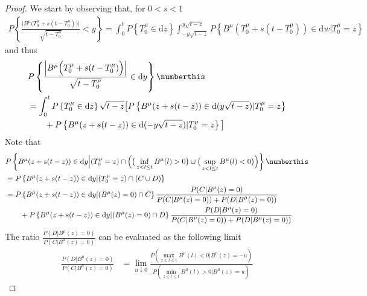 \begin{proof}
	We start by observing that, for $  0< s<1 $
	\begin{align}
		P\left\{   
	\frac { 
		\Big | B^\mu\Big ( T_0^\mu + s ( t - T_0^\mu) \Big )  \Big |    
	}
	{
		\sqrt{t - T^\mu_0}
	} <  y 
	\right\} 
	= 
	\int_0^t P\left\{T_0^\mu \in \mathrm d z \right\} \int_{ -y \sqrt{t-z}}^{ y \sqrt{t-z}}
	P \left\{ 
	 B^\mu  ( T_0^\mu + s ( t - T_0^\mu) )  \in \mathrm d w \Big | T_0^\mu = z
	\right\}
	\end{align}
	and thus 
	\begin{align*}
	&
	P\left\{   
	\frac { 
		\Big | B^\mu\Big ( T_0^\mu + s ( t - T_0^\mu) \Big )  \Big |    
	}
	{
		\sqrt{t - T^\mu_0}
	} \in \mathrm d y 
	\right\} 
	\numberthis 
	\label{eq:mdr-repr-full}
	\\
	 &=
	 \int_0^t P\left\{T_0^\mu \in \mathrm d z \right\} \sqrt{t -z}
	 \big[
	 P \left\{ 
	 B^\mu ( z + s (t-z)) \in \mathrm d (  y \sqrt{t-z}) | T_0^\mu = z
 	 \right\} 
 	 \\
 	 & \qquad 
 	 +
 	 P \left\{ 
 	 B^\mu ( z + s (t-z)) \in \mathrm d ( - y \sqrt{t-z}) | T_0^\mu = z
 	 \right\} 
	 \big]
	\end{align*}
	Note that 
	\begin{align*}
	&
	P\left\{ 
	B^\mu ( z + s (t-z)) \in \mathrm d y \Big | (T_0^\mu = z) \cap 
	\Big ( 
	\big( 
	\inf_{z < l \leq t} B^\mu ( l ) > 0 
	 \big)
	 \cup 
	 \big( 
	 \sup_{z < l \leq t} B^\mu ( l ) < 0 
	 \big)
	 \Big)
	\right\}
	\numberthis 
	\\
	&=
	P\left\{ 
	B^\mu ( z + s (t-z)) \in \mathrm d y | (T_0^\mu = z) \cap 
	(C
	\cup 
	D)
	\right\}
	\\
	&=
	P\left\{ 
	B^\mu ( z + s (t-z)) \in \mathrm d y | (B^\mu(z) = 0) \cap 
	C
	\right\} 
	\frac{\displaystyle
		P(C | B^\mu(z) = 0 )}
	{
		\displaystyle
			P(C | B^\mu(z) = 0 )) + 
		P(D | B^\mu(z) = 0 ))}
	\\
	& 
	\qquad + 
	P\left\{ 
	B^\mu ( z + s (t-z)) \in \mathrm d y | (B^\mu(z) = 0) \cap 
	D
	\right\} 
	\frac{\displaystyle
		P(D | B^\mu(z) = 0 )}
	{
		\displaystyle
		P(C | B^\mu(z) = 0 )) + 
		P(D | B^\mu(z) = 0 ))}
	\end{align*}
	The ratio 
	$  \frac{P(D | B^\mu(z) = 0)}{P( C |B^\mu(z) = 0 )} $
	can be evaluated as the following limit
	\begin{align*}
	\frac{P(D | B^\mu(z) = 0)}{P( C |B^\mu(z) = 0 )} 
	&= 
	\lim_{u \downarrow 0 } 
	\frac{
		P ( \max_{z \leq l \leq t} B^\mu ( l ) < 0  | B^\mu(z) =  - u)
	}{P ( \min_{z \leq l \leq t} B^\mu ( l ) > 0  | B^\mu(z) =  u)}

\end{align*}
\end{proof}
